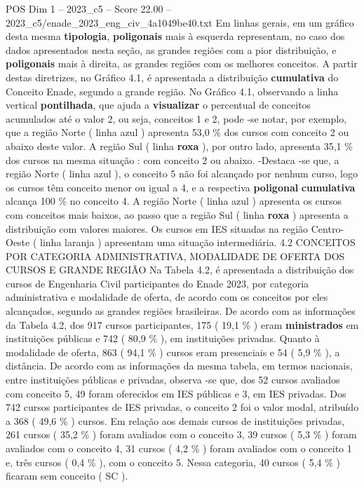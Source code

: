 \begin{textsample}{POS Dim 1 – 2023\_c5 – Score 22.00 – 2023\_c5/enade\_2023\_eng\_civ\_4a1049be40.txt}
Em linhas gerais, em um gráfico desta mesma \textbf{tipologia}, \textbf{poligonais} mais à esquerda representam, no caso dos dados apresentados nesta seção, as grandes regiões com a pior distribuição, e \textbf{poligonais} mais à direita, as grandes regiões com os melhores conceitos.
A partir destas diretrizes, no Gráfico 4.1, é apresentada a distribuição \textbf{cumulativa} do Conceito Enade, segundo a grande região.
No Gráfico 4.1, observando a linha vertical \textbf{pontilhada}, que ajuda a \textbf{visualizar} o percentual de conceitos acumulados até o valor 2, ou seja, conceitos 1 e 2, pode -se notar, por exemplo, que a região Norte ( linha azul ) apresenta 53,0 \% dos cursos com conceito 2 ou abaixo deste valor.
A região Sul ( linha \textbf{roxa} ), por outro lado, apresenta 35,1 \% dos cursos na mesma situação : com conceito 2 ou abaixo. -Destaca -se que, a região Norte ( linha azul ), o conceito 5 não foi alcançado por nenhum curso, logo os cursos têm conceito menor ou igual a 4, e a respectiva \textbf{poligonal} \textbf{cumulativa} alcança 100 \% no conceito 4.
A região Norte ( linha azul ) apresenta os cursos com conceitos mais baixos, ao passo que a região Sul ( linha \textbf{roxa} ) apresenta a distribuição com valores maiores.
Os cursos em IES situadas na região Centro-Oeste ( linha laranja ) apresentam uma situação intermediária. 4.2 CONCEITOS POR CATEGORIA ADMINISTRATIVA, MODALIDADE DE OFERTA DOS CURSOS E GRANDE REGIÃO Na Tabela 4.2, é apresentada a distribuição dos cursos de Engenharia Civil participantes do Enade 2023, por categoria administrativa e modalidade de oferta, de acordo com os conceitos por eles alcançados, segundo as grandes regiões brasileiras.
De acordo com as informações da Tabela 4.2, dos 917 cursos participantes, 175 ( 19,1 \% ) eram \textbf{ministrados} em instituições públicas e 742 ( 80,9 \% ), em instituições privadas.
Quanto à modalidade de oferta, 863 ( 94,1 \% ) cursos eram presenciais e 54 ( 5,9 \% ), a distância.
De acordo com as informações da mesma tabela, em termos nacionais, entre instituições públicas e privadas, observa -se que, dos 52 cursos avaliados com conceito 5, 49 foram oferecidos em IES públicas e 3, em IES privadas.
Dos 742 cursos participantes de IES privadas, o conceito 2 foi o valor modal, atribuído a 368 ( 49,6 \% ) cursos.
Em relação aos demais cursos de instituições privadas, 261 cursos ( 35,2 \% ) foram avaliados com o conceito 3, 39 cursos ( 5,3 \% ) foram avaliados com o conceito 4, 31 cursos ( 4,2 \% ) foram avaliados com o conceito 1 e, três cursos ( 0,4 \% ), com o conceito 5.
Nessa categoria, 40 cursos ( 5,4 \% ) ficaram sem conceito ( SC ).

\end{textsample}
